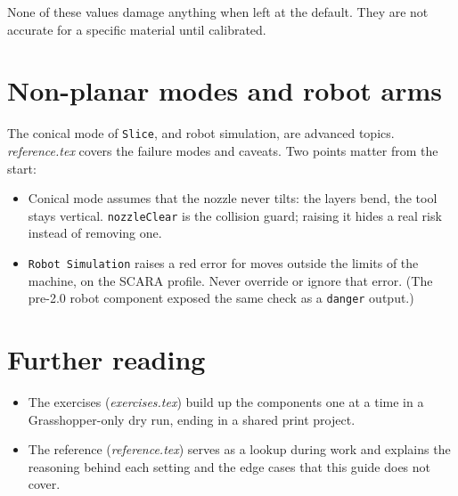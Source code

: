\documentclass[11pt]{article}
\newcommand{\param}[1]{\texttt{#1}}
\begin{document}
None of these values damage anything when left at the default. They are
not accurate for a specific material until calibrated.

\section{Non-planar modes and robot arms}

The conical mode of \param{Slice}, and robot simulation, are
advanced topics. \emph{reference.tex} covers the failure modes and
caveats. Two points matter from the start:

\begin{itemize}
  \item Conical mode assumes that the nozzle never tilts: the layers bend, the tool stays vertical. \param{nozzleClear} is the collision guard; raising it hides a real risk instead of removing one.
  \item \param{Robot Simulation} raises a red error for moves outside the limits of the machine, on the SCARA profile. Never override or ignore that error. (The pre-2.0 robot component exposed the same check as a \param{danger} output.)
\end{itemize}

\section{Further reading}

\begin{itemize}
  \item The exercises (\emph{exercises.tex}) build up the components one at a time in a Grasshopper-only dry run, ending in a shared print project.
  \item The reference (\emph{reference.tex}) serves as a lookup during work and explains the reasoning behind each setting and the edge cases that this guide does not cover.
\end{itemize}
\end{document}
